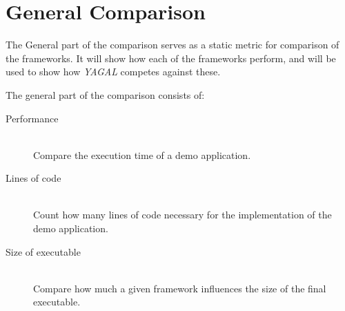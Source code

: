 \section{General Comparison}
The General part of the comparison serves as a static metric for comparison of the frameworks. It will show how each of the frameworks perform, and will be used to show how \textit{YAGAL} competes against these. 

The general part of the comparison consists of:
\begin{description}
\item[Performance]\hfill\\
Compare the execution time of a demo application.
\item[Lines of code]\hfill\\
Count how many lines of code necessary for the implementation of the demo application.
\item[Size of executable]\hfill\\
Compare how much a given framework influences the size of the final executable.
\end{description}